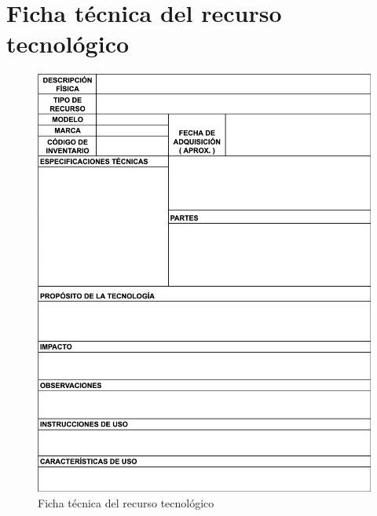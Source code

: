 \appendix
\chapter{Ficha técnica del recurso tecnológico}
\label{apendice:ficha}
\begin{figure}[htbp]
    \centering
    \includegraphics[width=\textwidth,height=0.85\textheight,keepaspectratio]{apendices/caracterizacionInfraestructura.png}
    \caption{Ficha técnica del recurso tecnológico}
    \label{fig:tabla-ficha-tecnica}
\end{figure}

